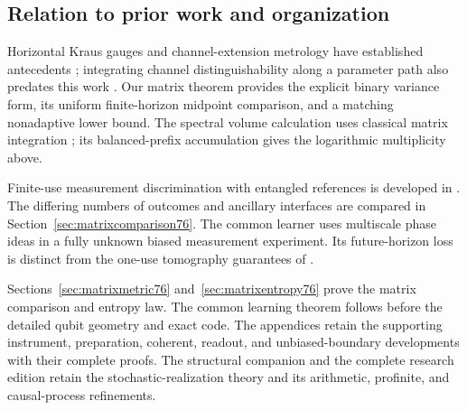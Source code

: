 \subsection{Relation to prior work and organization}
Horizontal Kraus gauges and channel-extension metrology have
established antecedents \cite{FI76,DKG67,DM76,KGAD76}; integrating
channel distinguishability along a parameter path also predates
this work \cite{YF76,SD76}. Our matrix theorem provides the explicit
binary variance form, its uniform finite-horizon midpoint
comparison, and a matching nonadaptive lower bound. The spectral
volume calculation uses classical matrix integration
\cite{Dittmann76,SZGeom76}; its balanced-prefix accumulation gives
the logarithmic multiplicity above.

Finite-use measurement discrimination with entangled references
is developed in \cite{PPKKO72,KPP76,DBSA76}. The differing numbers
of outcomes and ancillary interfaces are compared in
Section~\ref{sec:matrixcomparison76}. The common learner uses
multiscale phase ideas \cite{HB76,KLY76} in a fully unknown biased
measurement experiment. Its future-horizon loss is distinct from
the one-use tomography guarantees of \cite{MB67,ZRK76}.

Sections~\ref{sec:matrixmetric76} and~\ref{sec:matrixentropy76}
prove the matrix comparison and entropy law. The common learning
theorem follows before the detailed qubit geometry and exact code.
The appendices retain the supporting instrument, preparation,
coherent, readout, and unbiased-boundary developments with their
complete proofs. The structural companion and the complete
research edition retain the stochastic-realization theory and
its arithmetic, profinite, and causal-process refinements.
